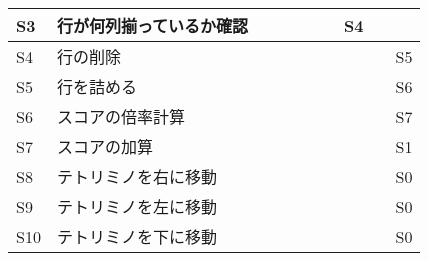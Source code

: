\begin{landscape}
\begin{table}[htb]
\begin{tabular}{|l|l|l|l|l|l|l|l|l|l|}
S3   & 行が何列揃っているか確認 &         &                                                           &                                                          &                                                            &                                                           & S4      &      &                   \\ \hline
S4   & 行の削除         &         &                                                           &                                                          &                                                            &                                                           &         &      & S5                \\ \hline
S5   & 行を詰める        &         &                                                           &                                                          &                                                            &                                                           &         &      & S6                \\ \hline
S6   & スコアの倍率計算     &         &                                                           &                                                          &                                                            &                                                           &         &      & S7                \\ \hline
S7   & スコアの加算       &         &                                                           &                                                          &                                                            &                                                           &         &      & S1                \\ \hline
S8   & テトリミノを右に移動   &         &                                                           &                                                          &                                                            &                                                           &         &      & S0                \\ \hline
S9   & テトリミノを左に移動   &         &                                                           &                                                          &                                                            &                                                           &         &      & S0                \\ \hline
S10  & テトリミノを下に移動   &         &                                                           &                                                          &                                                            &                                                           &         &      & S0                \\ \hline

\end{tabular}
\end{table}
\end{landscape}
